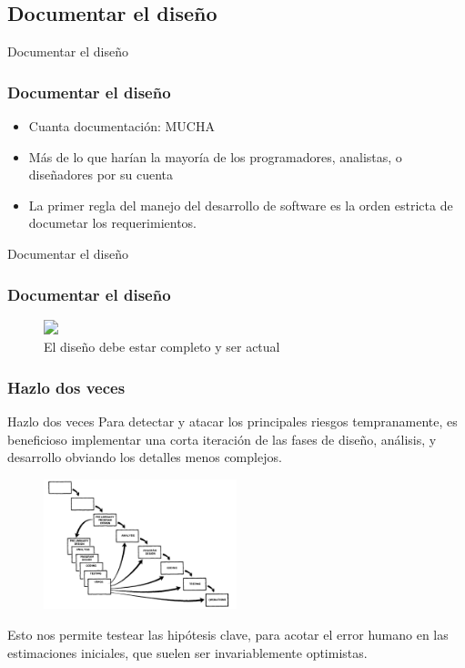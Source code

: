 \documentclass{beamer}
\begin{document}
\subsection{Documentar el diseño}

\begin{frame}{Documentar el diseño}
\frametitle{Documentar el diseño}

\begin{itemize}
\item Cuanta documentación: MUCHA
\item Más de lo que harían la mayoría de los programadores, analistas, o diseñadores por su cuenta
\item La primer regla del manejo del desarrollo de  software es la orden estricta de documetar los requerimientos.

\end{itemize}

\end{frame}


\begin{frame}{Documentar el diseño}
\frametitle{Documentar el diseño}
\begin{figure}
\includegraphics<1>[width=.5\textwidth, angle=90]{figures/design.png}
\caption{El diseño debe estar completo y ser actual}

\end{figure}


\end{frame}



\subsubsection{Hazlo dos veces}
\begin{frame}{Hazlo dos veces}
Para detectar y atacar los principales riesgos tempranamente, es beneficioso implementar una corta iteración de las fases de diseño, análisis, y desarrollo obviando los detalles menos complejos.

\begin{figure}
\includegraphics[width=0.5\textwidth]{figures/hazloDosVeces.png}
\end{figure}

Esto nos permite testear las hipótesis clave, para acotar el error humano en las estimaciones iniciales, que suelen ser invariablemente optimistas.

\end{frame}
\end{document}
